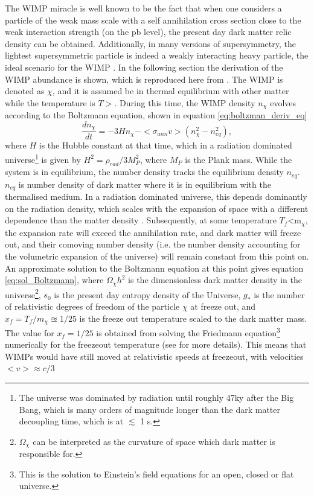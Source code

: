 The WIMP miracle is well known to be the fact that when one considers a particle of the weak mass scale with a self annihilation cross section close to the weak interaction strength (on the pb level), the present day dark matter relic density can be obtained. Additionally, in many versions of supersymmetry, the lightest supersymmetric particle is indeed a weakly interacting heavy particle, the ideal scenario for the WIMP \cite{Supersymmetry_primer}. In the following section the derivation of the WIMP abundance is shown, which is reproduced here from \cite{BAER20151}. The WIMP is denoted as $\chi$, and it is assumed be in thermal equilibrium with other matter while the temperature is $T>$\dmm . During this time, the WIMP density $n_\chi$ evolves according to the Boltzmann equation, shown in equation \ref{eq:boltzman_deriv_eq}
\begin{equation}\label{eq:boltzman_deriv_eq}
    \frac{dn_\chi}{dt} = -3H n_\chi - <\sigma_{ann}v>(n_\chi^2 - n_{eq}^2),
\end{equation}
where $H$ is the Hubble constant at that time, which in a radiation dominated universe\footnote{The universe was dominated by radiation until roughly 47ky after the Big Bang, which is many orders of magnitude longer than the dark matter decoupling time, which is at $\lesssim$ 1 s.} is given by $H^2 = \rho_{rad}/3M^2_P$, where $M_P$ is the Plank mass. While the system is in equilibrium, the number density tracks the equilibrium density $n_{eq}$. $n_{eq}$ is number density of dark matter where it is in equilibrium with the thermalised medium. In a radiation dominated universe, this depends dominantly on the radiation density, which scales with the expansion of space with a different dependence than the matter density \cite{padmanabhan_1999}. Subsequently, at some temperature $T_f$<m$_\chi$, the expansion rate will exceed the annihilation rate, and dark matter will freeze out, and their comoving number density (i.e. the number density accounting for the volumetric expansion of the universe) will remain constant from this point on. An approximate solution to the Boltzmann equation at this point gives equation \ref{eq:sol_Boltzmann}, where $\Omega_\chi h^2$ is the dimensionless dark matter density in the universe\footnote{$\Omega_\chi$ can be interpreted as the curvature of space which dark matter is responsible for.}, $s_0$ is the present day entropy density of the Universe, $g_*$ is the number of relativistic degrees of freedom of the particle $\chi$ at freeze out, and $x_f = T_f/m_\chi \approxeq 1/25$ is the freeze out temperature scaled to the dark matter mass. The value for $x_f=1/25$ is obtained from solving the Friedmann equation\footnote{This is the solution to Einstein's field equations for an open, closed or flat universe.} numerically for the freezeout temperature (see \cite{BAER20151} for more details). This means that WIMPs would have still moved at relativistic speeds at freezeout, with velocities $<v>\approx c/3$ 


